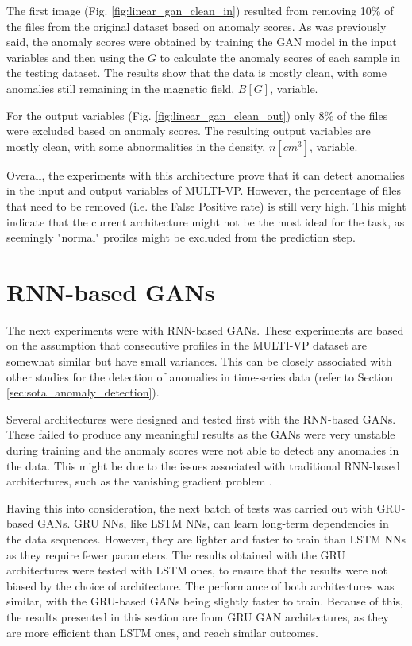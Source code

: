 The first image (Fig. \ref{fig:linear_gan_clean_in}) resulted from removing 10\% of the files from the original dataset based on anomaly scores. As was previously said, the anomaly scores were obtained by training the GAN model in the input variables and then using the $G$ to calculate the anomaly scores of each sample in the testing dataset. The results show that the data is mostly clean, with some anomalies still remaining in the magnetic field, $B [G]$, variable.

For the output variables (Fig. \ref{fig:linear_gan_clean_out}) only 8\% of the files were excluded based on anomaly scores. The resulting output variables are mostly clean, with some abnormalities in the density, $n [cm^3]$, variable.

Overall, the experiments with this architecture prove that it can detect anomalies in the input and output variables of MULTI-VP. However, the percentage of files that need to be removed (i.e. the False Positive rate) is still very high. This might indicate that the current architecture might not be the most ideal for the task, as seemingly "normal" profiles might be excluded from the prediction step.


\section{RNN-based GANs}\label{sec:gan_experiment_lstm}

The next experiments were with RNN-based GANs. These experiments are based on the assumption that consecutive profiles in the MULTI-VP dataset are somewhat similar but have small variances. This can be closely associated with other studies for the detection of anomalies in time-series data (refer to Section \ref{sec:sota_anomaly_detection}). 

Several architectures were designed and tested first with the RNN-based GANs. These failed to produce any meaningful results as the GANs were very unstable during training and the anomaly scores were not able to detect any anomalies in the data. This might be due to the issues associated with traditional RNN-based architectures, such as the vanishing gradient problem \cite{Schmidt_RecurrentNeuralNetworks_2019}.

Having this into consideration, the next batch of tests was carried out with GRU-based GANs. GRU NNs, like LSTM NNs, can learn long-term dependencies in the data sequences. However, they are lighter and faster to train than LSTM NNs as they require fewer parameters. The results obtained with the GRU architectures were tested with LSTM ones, to ensure that the results were not biased by the choice of architecture. The performance of both architectures was similar, with the GRU-based GANs being slightly faster to train. Because of this, the results presented in this section are from GRU GAN architectures, as they are more efficient than LSTM ones, and reach similar outcomes.

